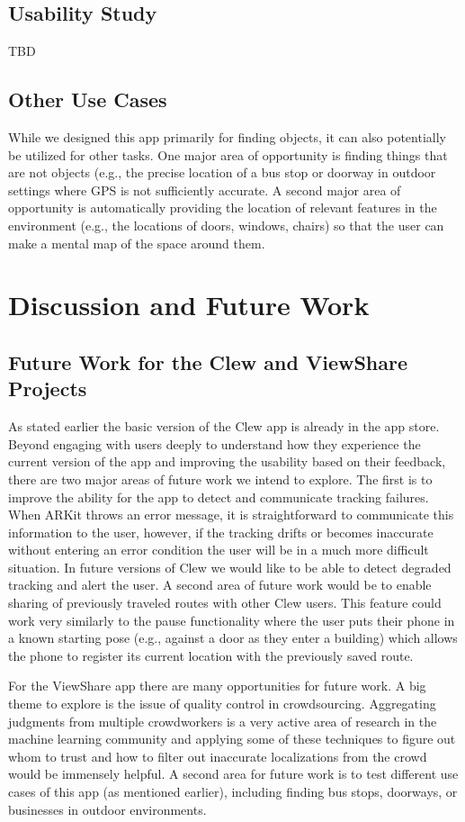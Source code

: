 \documentclass[chi_draft]{sigchi}
\begin{document}
\subsection{Usability Study}
TBD

\subsection{Other Use Cases}
While we designed this app primarily for finding objects, it can also potentially be utilized for other tasks.  One major area of opportunity is finding things that are not objects (e.g., the precise location of a bus stop or doorway in outdoor settings where GPS is not sufficiently accurate.  A second major area of opportunity is automatically providing the location of relevant features in the environment (e.g., the locations of doors, windows, chairs) so that the user can make a mental map of the space around them.

\section{Discussion and Future Work}

\subsection{Future Work for the Clew and ViewShare Projects}
As stated earlier the basic version of the Clew app is already in the app store.  Beyond engaging with users deeply to understand how they experience the current version of the app and improving the usability based on their feedback, there are two major areas of future work we intend to explore.  The first is to improve the ability for the app to detect and communicate tracking failures.  When ARKit throws an error message, it is straightforward to communicate this information to the user, however, if the tracking drifts or becomes inaccurate without entering an error condition the user will be in a much more difficult situation.  In future versions of Clew we would like to be able to detect degraded tracking and alert the user.  A second area of future work would be to enable sharing of previously traveled routes with other Clew users.  This feature could work very similarly to the pause functionality where the user puts their phone in a known starting pose (e.g., against a door as they enter a building) which allows the phone to register its current location with the previously saved route.

For the ViewShare app there are many opportunities for future work.  A big theme to explore is the issue of quality control in crowdsourcing.  Aggregating judgments from multiple crowdworkers is a very active area of research in the machine learning community and applying some of these techniques to figure out whom to trust and how to filter out inaccurate localizations from the crowd would be immensely helpful.  A second area for future work is to test different use cases of this app (as mentioned earlier), including finding bus stops, doorways, or businesses in outdoor environments.
\end{document}
